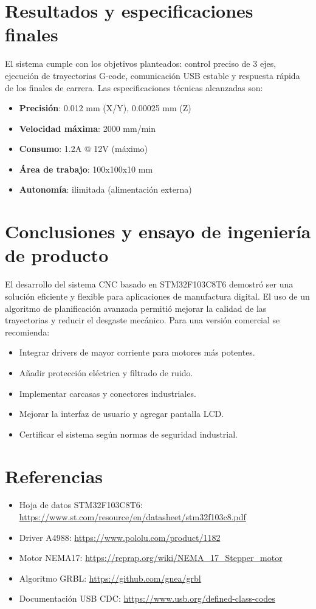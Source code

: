 \documentclass[a4paper,12pt]{article}
\begin{document}
\section{Resultados y especificaciones finales}
El sistema cumple con los objetivos planteados: control preciso de 3 ejes, ejecución de trayectorias G-code, comunicación USB estable y respuesta rápida de los finales de carrera. Las especificaciones técnicas alcanzadas son:
\begin{itemize}
    \item \textbf{Precisión}: 0.012 mm (X/Y), 0.00025 mm (Z)
    \item \textbf{Velocidad máxima}: 2000 mm/min
    \item \textbf{Consumo}: 1.2A @ 12V (máximo)
    \item \textbf{Área de trabajo}: 100x100x10 mm
    \item \textbf{Autonomía}: ilimitada (alimentación externa)
\end{itemize}

\section{Conclusiones y ensayo de ingeniería de producto}
El desarrollo del sistema CNC basado en STM32F103C8T6 demostró ser una solución eficiente y flexible para aplicaciones de manufactura digital. El uso de un algoritmo de planificación avanzada permitió mejorar la calidad de las trayectorias y reducir el desgaste mecánico. Para una versión comercial se recomienda:
\begin{itemize}
    \item Integrar drivers de mayor corriente para motores más potentes.
    \item Añadir protección eléctrica y filtrado de ruido.
    \item Implementar carcasas y conectores industriales.
    \item Mejorar la interfaz de usuario y agregar pantalla LCD.
    \item Certificar el sistema según normas de seguridad industrial.
\end{itemize}

\section{Referencias}
\begin{itemize}
    \item Hoja de datos STM32F103C8T6: \url{https://www.st.com/resource/en/datasheet/stm32f103c8.pdf}
    \item Driver A4988: \url{https://www.pololu.com/product/1182}
    \item Motor NEMA17: \url{https://reprap.org/wiki/NEMA_17_Stepper_motor}
    \item Algoritmo GRBL: \url{https://github.com/gnea/grbl}
    \item Documentación USB CDC: \url{https://www.usb.org/defined-class-codes}
\end{itemize}
\end{document}
